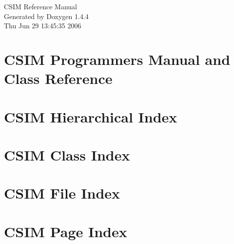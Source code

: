 \documentclass[a4paper]{book}
\begin{document}
\begin{titlepage}
\vspace*{7cm}
\begin{center}
{\Large CSIM Reference Manual}\\
\vspace*{1cm}
{\large Generated by Doxygen 1.4.4}\\
\vspace*{0.5cm}
{\small Thu Jun 29 13:45:35 2006}\\
\end{center}
\end{titlepage}
\clearemptydoublepage
{}
\tableofcontents
\clearemptydoublepage
{}
\chapter{CSIM Programmers Manual and Class Reference }
\label{index}\hypertarget{index}{}
\chapter{CSIM Hierarchical Index}

\chapter{CSIM Class Index}

\chapter{CSIM File Index}

\chapter{CSIM Page Index}

\end{document}
